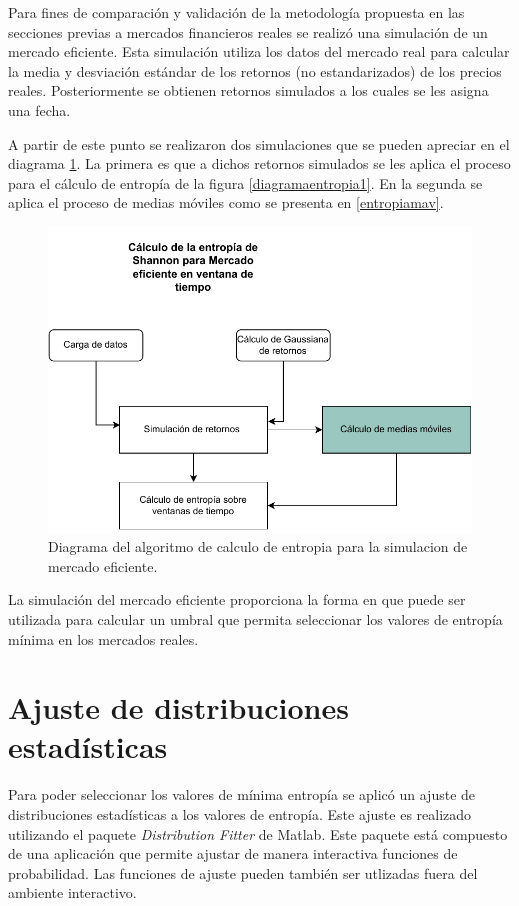 Para fines de comparación y validación de la metodología propuesta en las secciones previas a mercados financieros reales se realizó una simulación de un mercado eficiente.
Esta simulación utiliza los datos del mercado real para calcular la media y desviación estándar  de los retornos (no estandarizados) de los precios reales. 
Posteriormente se obtienen retornos simulados a los cuales se les asigna una fecha.

A partir de este punto se realizaron dos simulaciones que se pueden apreciar en el diagrama \ref{simulacion}.
La primera es que a dichos retornos simulados se les aplica el proceso para el cálculo de entropía de la figura \ref{diagramaentropia1}.
En la segunda se aplica el proceso de medias móviles como se presenta en \ref{entropiamav}.

\begin{figure}
	\centering
	\includegraphics[width=0.9\linewidth]{figures/simulacion}
	\caption{Diagrama del algoritmo de calculo de entropia para la simulacion de mercado eficiente. }
	\label{simulacion}
\end{figure}

La simulación del mercado eficiente proporciona la forma en que puede ser utilizada para calcular un umbral que permita seleccionar los valores de entropía mínima en los mercados reales. 
 
\section{Ajuste de distribuciones estadísticas}
\label{ajuste}
Para poder seleccionar los valores de mínima entropía se aplicó un ajuste de distribuciones estadísticas a los valores de entropía.
Este ajuste es realizado utilizando el paquete \textit{Distribution Fitter} de Matlab.
Este paquete está compuesto de una aplicación que permite ajustar de manera interactiva funciones de probabilidad.
Las funciones de ajuste pueden también ser utlizadas fuera del ambiente interactivo.

